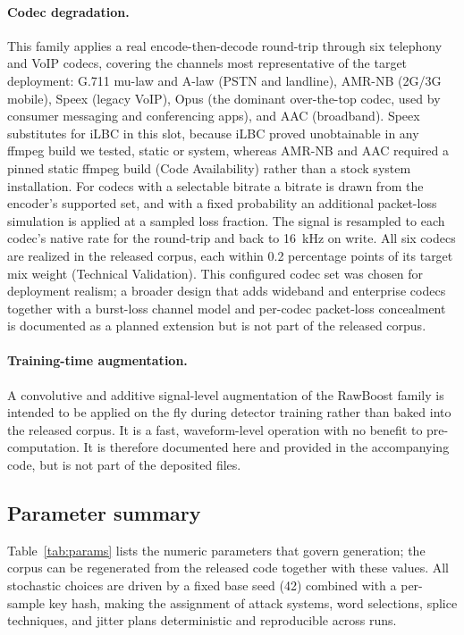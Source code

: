 \documentclass[11pt]{article}
\begin{document}
\paragraph{Codec degradation.} This family applies a real
encode-then-decode round-trip through six telephony and VoIP codecs,
covering the channels most representative of the target deployment:
G.711 mu-law and A-law (PSTN and landline), AMR-NB (2G/3G mobile), Speex
(legacy VoIP), Opus (the dominant over-the-top codec, used by consumer
messaging and conferencing apps), and AAC (broadband). Speex substitutes
for iLBC in this slot, because iLBC proved unobtainable in any ffmpeg
build we tested, static or system, whereas AMR-NB and AAC required a pinned
static ffmpeg build (Code Availability) rather than a stock system
installation. For codecs with a selectable bitrate a bitrate is drawn
from the encoder's supported set, and with a fixed probability an
additional packet-loss simulation is applied at a sampled loss fraction.
The signal is resampled to each codec's native rate for the round-trip
and back to \SI{16}{\kilo\hertz} on write. All six codecs are realized
in the released corpus, each within 0.2 percentage points of its target
mix weight (Technical Validation). This configured codec set was chosen
for deployment realism; a broader design that adds wideband and
enterprise codecs together with a burst-loss channel model and per-codec
packet-loss concealment is documented as a planned extension but is not
part of the released corpus.

\paragraph{Training-time augmentation.} A convolutive and additive
signal-level augmentation of the RawBoost family \citep{tak2022ssl} is
intended to be applied on the fly during detector training rather than
baked into the released corpus. It is a fast, waveform-level operation with no benefit to
pre-computation. It is therefore documented here and provided in the
accompanying code, but is not part of the deposited files.

\subsection*{Parameter summary}

Table~\ref{tab:params} lists the numeric parameters that govern
generation; the corpus can be regenerated from the released code
together with these values. All stochastic choices are driven by a
fixed base seed (42) combined with a per-sample key hash, making the
assignment of attack systems, word selections, splice techniques, and
jitter plans deterministic and reproducible across runs.
\end{document}
